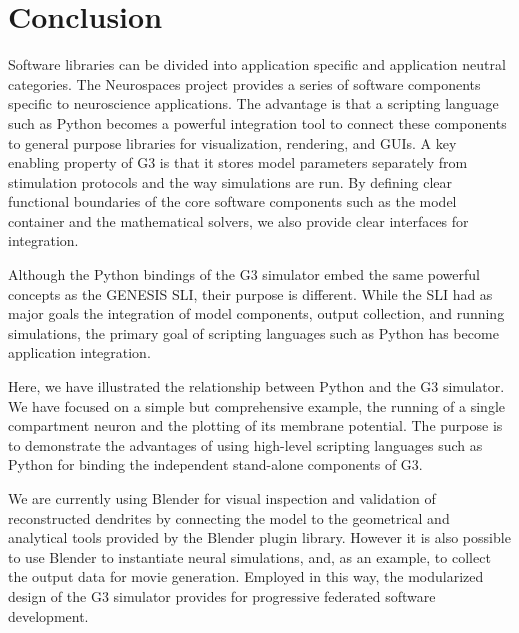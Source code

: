 \documentclass[12pt]{article}
\begin{document}
{\vspace*{-4mm}
\section{Conclusion}

Software libraries can be divided into application specific and
application neutral categories.  The Neurospaces project provides a
series of software components specific to neuroscience applications.
The advantage is that a scripting language such as Python becomes a
powerful integration tool to connect these components to general
purpose libraries for visualization, rendering, and GUIs.  A key
enabling property of G3 is that it stores model parameters separately
from stimulation protocols and the way simulations are run.  By
defining clear functional boundaries of the core software components
such as the model container and the mathematical solvers, we also
provide clear interfaces for integration.

Although the Python bindings of the G3 simulator embed the same
powerful concepts as the GENESIS SLI, their purpose is different.
While the SLI had as major goals the integration of model components,
output collection, and running simulations, the primary goal of
scripting languages such as Python has become application integration.

Here, we have illustrated the relationship between Python and the G3
simulator.  We have focused on a simple but comprehensive example, the
running of a single compartment neuron and the plotting of its
membrane potential. The purpose is to demonstrate the advantages of
using high-level scripting languages such as Python for binding the
independent stand-alone components of G3.


We are currently using Blender for visual inspection and validation of
reconstructed dendrites by connecting the model to the geometrical and
analytical tools provided by the Blender plugin library.  However it
is also possible to use Blender to instantiate neural simulations,
and, as an example, to collect the output data for movie generation.
Employed in this way, the modularized design of the G3 simulator
provides for progressive federated software development.

}
\end{document}
